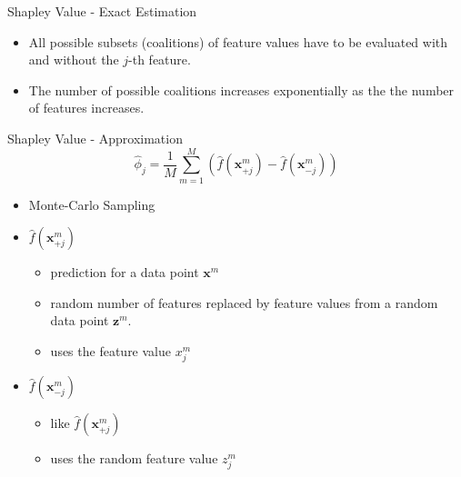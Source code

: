 \begin{frame}{Shapley Value - Exact Estimation}
	\begin{itemize}
		\item All possible subsets (coalitions) of feature values have to be evaluated with and without the $j$-th feature.
		\item The number of possible coalitions increases exponentially as the the number of features increases.
	\end{itemize}
\end{frame}
\begin{frame}{Shapley Value - Approximation\footnotemark}
\begin{equation}
	\hat{\phi}_{j}=\frac{1}{M}\sum_{m=1}^M\left(\hat{f}(\bm{x}^{m}_{+j})-\hat{f}(\bm{x}^{m}_{-j})\right)
\end{equation}
\begin{itemize}
	\item Monte-Carlo Sampling
	\item $\hat{f}(\bm{x}^{m}_{+j})$
	\begin{itemize}
		\item prediction for a data point $\bm{x}^m$
		\item random number of features replaced by feature values from a random data point $\bm{z}^m$.
		\item uses the feature value $x^m_j$
	\end{itemize}
	\item $\hat{f}(\bm{x}^{m}_{-j})$
	\begin{itemize}
		\item like $\hat{f}(\bm{x}^{m}_{+j})$
		\item uses the random feature value $z^m_j$
	\end{itemize}
\end{itemize}
\end{frame}